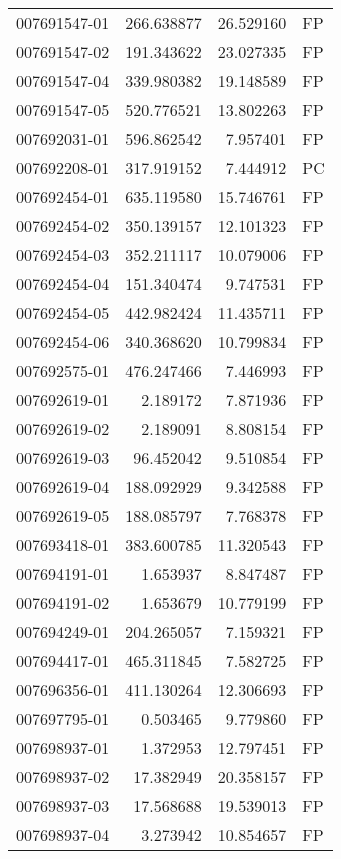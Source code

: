 \begin{tabular}{lrrl}
007691547-01 &  266.638877 &    26.529160 &   FP \\
007691547-02 &  191.343622 &    23.027335 &   FP \\
007691547-04 &  339.980382 &    19.148589 &   FP \\
007691547-05 &  520.776521 &    13.802263 &   FP \\
007692031-01 &  596.862542 &     7.957401 &   FP \\
007692208-01 &  317.919152 &     7.444912 &   PC \\
007692454-01 &  635.119580 &    15.746761 &   FP \\
007692454-02 &  350.139157 &    12.101323 &   FP \\
007692454-03 &  352.211117 &    10.079006 &   FP \\
007692454-04 &  151.340474 &     9.747531 &   FP \\
007692454-05 &  442.982424 &    11.435711 &   FP \\
007692454-06 &  340.368620 &    10.799834 &   FP \\
007692575-01 &  476.247466 &     7.446993 &   FP \\
007692619-01 &    2.189172 &     7.871936 &   FP \\
007692619-02 &    2.189091 &     8.808154 &   FP \\
007692619-03 &   96.452042 &     9.510854 &   FP \\
007692619-04 &  188.092929 &     9.342588 &   FP \\
007692619-05 &  188.085797 &     7.768378 &   FP \\
007693418-01 &  383.600785 &    11.320543 &   FP \\
007694191-01 &    1.653937 &     8.847487 &   FP \\
007694191-02 &    1.653679 &    10.779199 &   FP \\
007694249-01 &  204.265057 &     7.159321 &   FP \\
007694417-01 &  465.311845 &     7.582725 &   FP \\
007696356-01 &  411.130264 &    12.306693 &   FP \\
007697795-01 &    0.503465 &     9.779860 &   FP \\
007698937-01 &    1.372953 &    12.797451 &   FP \\
007698937-02 &   17.382949 &    20.358157 &   FP \\
007698937-03 &   17.568688 &    19.539013 &   FP \\
007698937-04 &    3.273942 &    10.854657 &   FP \\

\end{tabular}
